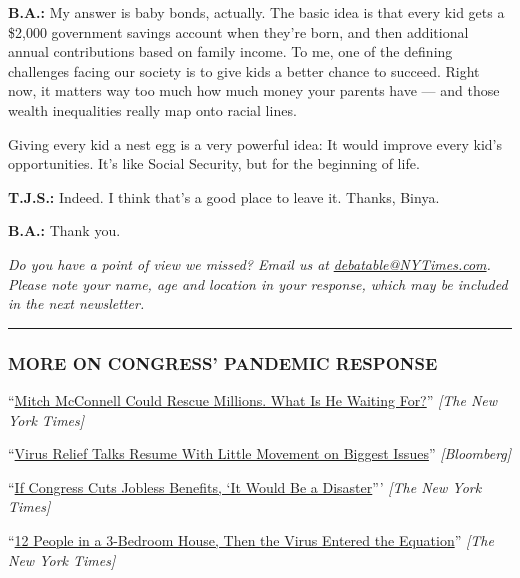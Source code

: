 \textbf{B.A.:} My answer is baby bonds, actually. The basic idea is that
every kid gets a \$2,000 government savings account when they're born,
and then additional annual contributions based on family income. To me,
one of the defining challenges facing our society is to give kids a
better chance to succeed. Right now, it matters way too much how much
money your parents have --- and those wealth inequalities really map
onto racial lines.

Giving every kid a nest egg is a very powerful idea: It would improve
every kid's opportunities. It's like Social Security, but for the
beginning of life.

\textbf{T.J.S.:} Indeed. I think that's a good place to leave it.
Thanks, Binya.

\textbf{B.A.:} Thank you.

\emph{Do you have a point of view we missed? Email us at}
\href{mailto:debatable@NYTimes.com}{\emph{debatable@NYTimes.com}}\emph{.
Please note your name, age and location in your response, which may be
included in the next newsletter.}

\begin{center}\rule{0.5\linewidth}{\linethickness}\end{center}

\hypertarget{more-on-congress-pandemic-response}{%
\subsubsection{MORE ON CONGRESS' PANDEMIC
RESPONSE}\label{more-on-congress-pandemic-response}}

``\href{https://www.nytimes3xbfgragh.onion/2020/07/30/opinion/mitch-mcconnell-coronavirus-economy.html}{Mitch
McConnell Could Rescue Millions. What Is He Waiting For?}'' \emph{{[}The
New York Times{]}}

``\href{https://www.bloomberg.com/news/articles/2020-08-04/pelosi-mnuchin-signal-first-halting-progress-on-stimulus-deal}{Virus
Relief Talks Resume With Little Movement on Biggest Issues}''
\emph{{[}Bloomberg{]}}

``\href{https://www.nytimes3xbfgragh.onion/2020/07/22/opinion/sunday/unemployment-supplement-congress.html}{If
Congress Cuts Jobless Benefits, `It Would Be a Disaster}''' \emph{{[}The
New York Times{]}}

``\href{https://www.nytimes3xbfgragh.onion/2020/08/01/business/economy/housing-overcrowding-coronavirus.html}{12
People in a 3-Bedroom House, Then the Virus Entered the Equation}''
\emph{{[}The New York Times{]}}

